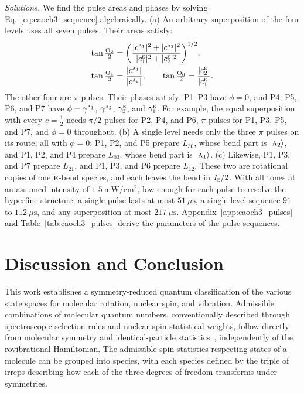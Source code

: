 \documentclass[
  reprint,
  aps,
  prx,
  superscriptaddress,
  amsmath,
  amssymb,
  longbibliography
]{revtex4-2}
\newcommand{\irr}[1]{\text{\normalfont\scshape #1}}
\begin{document}
\emph{Solutions.} We find the pulse areas and phases by solving Eq.~\eqref{eq:caoch3_sequence} algebraically. (a) An arbitrary superposition of the four levels uses all seven pulses. Their areas satisfy:
\begin{align}
\tan\tfrac{\Theta_2}{2}&=\biggl(\frac{|c^{\irr{a}_{1}}|^2+|c^{\irr{a}_{2}}|^2}{|c^{\irr{e}}_{1}|^2+|c^{\irr{e}}_{2}|^2}\biggr)^{1/2},\nonumber\\
\tan\tfrac{\Theta_4}{2}&=\frac{|c^{\irr{a}_{1}}|}{|c^{\irr{a}_{2}}|},\qquad\tan\tfrac{\Theta_6}{2}=\frac{|c^{\irr{e}}_{2}|}{|c^{\irr{e}}_{1}|}.
\label{eq:caoch3_areas}
\end{align}
The other four are $\pi$ pulses. Their phases satisfy: P1--P3 have $\phi=0$, and P4, P5, P6, and P7 have $\phi=\gamma^{\irr{a}_{1}}$, $\gamma^{\irr{a}_{2}}$, $\gamma^{\irr{e}}_{2}$, and $\gamma^{\irr{e}}_{1}$. For example, the equal superposition with every $c=\tfrac12$ needs $\pi/2$ pulses for P2, P4, and P6, $\pi$ pulses for P1, P3, P5, and P7, and $\phi=0$ throughout. (b) A single level needs only the three $\pi$ pulses on its route, all with $\phi=0$: P1, P2, and P5 prepare $L_{30}$, whose bend part is $\ket{\irr{a}_{2}}$, and P1, P2, and P4 prepare $L_{03}$, whose bend part is $\ket{\irr{a}_{1}}$. (c) Likewise, P1, P3, and P7 prepare $L_{21}$, and P1, P3, and P6 prepare $L_{12}$. These two are rotational copies of one $\irr{e}$-bend species, and each leaves the bend in $I_{\irr{e}}/2$. With all tones at an assumed intensity of $1.5\ \mathrm{mW/cm^2}$, low enough for each pulse to resolve the hyperfine structure, a single pulse lasts at most $51~\mu\mathrm{s}$, a single-level sequence $91$ to $112~\mu\mathrm{s}$, and any superposition at most $217~\mu\mathrm{s}$. Appendix~\ref{app:caoch3_pulses} and Table~\ref{tab:caoch3_pulses} derive the parameters of the pulse sequences.





\section{Discussion and Conclusion}
\label{sec:discussion}

This work establishes a symmetry-reduced quantum classification of the various state spaces for molecular rotation, nuclear spin, and vibration. 
Admissible combinations of molecular quantum numbers, conventionally described through spectroscopic selection rules and nuclear-spin statistical weights, follow directly from molecular symmetry and identical-particle statistics~\cite{LonguetHiggins1963, BunkerJensen2006}, independently of the rovibrational Hamiltonian. 
The admissible spin-statistics-respecting states of a molecule can be grouped into species, with each species defined by the triple of irreps describing how each of the three degrees of freedom transforms under symmetries. 
\end{document}
